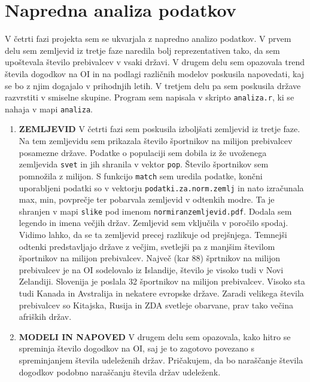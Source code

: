 \documentclass[11pt,a4paper]{article}
\begin{document}
\section{Napredna analiza podatkov}
V četrti fazi projekta sem se ukvarjala z napredno analizo podatkov. V prvem delu sem zemljevid iz tretje faze naredila bolj reprezentativen tako, da sem upoštevala število prebivalcev v vsaki državi. V drugem delu sem opazovala trend števila dogodkov na OI in na podlagi različnih modelov poskusila napovedati, kaj se bo z njim dogajalo v prihodnjih letih. V tretjem delu pa sem poskusila države razvrstiti v smiselne skupine. Program sem napisala v skripto \verb|analiza.r|, ki se nahaja v mapi \verb|analiza|.
\newline
\begin{enumerate}
\item{\textbf{ZEMLJEVID}
\newline
V četrti fazi sem poskusila izboljšati zemljevid iz tretje faze. Na tem zemljevidu sem prikazala število športnikov na milijon prebivalcev posamezne države. Podatke o populaciji sem dobila iz že uvoženega zemljevida \verb|svet| in jih shranila v vektor \verb|pop|. Število športnikov sem pomnožila z milijon. S funkcijo \verb|match| sem uredila podatke, končni uporabljeni podatki so v vektorju \verb|podatki.za.norm.zemlj| in nato izračunala max, min, povprečje ter pobarvala zemljevid v odtenkih modre. Ta je shranjen v mapi \verb|slike| pod imenom \verb|normiranzemljevid.pdf|. Dodala sem legendo in imena večjih držav. Zemljevid sem vključila v poročilo spodaj.
\newline
Vidimo lahko, da se ta zemljevid precej razlikuje od prejšnjega. Temnejši odtenki predstavljajo države z večjim, svetlejši pa z manjšim številom športnikov na milijon prebivalcev. Največ (kar 88) šprtnikov na milijon prebivalcev je na OI sodelovalo iz Islandije, število je visoko tudi v Novi Zelandiji. Slovenija je poslala 32 športnikov na milijon prebivalcev. Visoko sta tudi Kanada in Avstralija in nekatere evropske države. Zaradi velikega števila prebivalcev so Kitajska, Rusija in ZDA svetleje obarvane, prav tako večina afriških držav.
}
\newpage
\item{\textbf{MODELI IN NAPOVED}
\newline
V drugem delu sem opazovala, kako hitro se spreminja število dogodkov na OI, saj je to zagotovo povezano s spreminjanjem števila udeleženih držav. Pričakujem, da bo naraščanje števila dogodkov podobno naraščanju števila držav udeleženk.
}
\end{enumerate}
\end{document}
